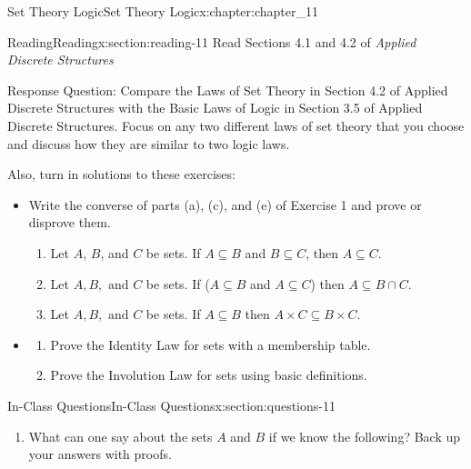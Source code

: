 \documentclass[oneside,10pt,]{book}
\numberwithin{equation}{section}
\begin{document}
\begin{chapterptx}{Set Theory Logic}{}{Set Theory Logic}{}{}{x:chapter:chapter_11}
%
%
\typeout{************************************************}
\typeout{************************************************}
%
\begin{sectionptx}{Reading}{}{Reading}{}{}{x:section:reading-11}
Read Sections 4.1  and 4.2 of \emph{Applied Discrete Structures}%
\par
Response Question: Compare the Laws of Set Theory in Section 4.2 of Applied Discrete Structures with the Basic Laws of Logic in Section 3.5 of Applied Discrete Structures.  Focus on any two different laws of set theory that you choose and discuss how they are similar to two logic laws.%
\par
Also, turn in solutions to these exercises:%
\begin{itemize}[label=\textbullet]
\item{}Write the converse of parts (a), (c), and (e) of Exercise 1 and prove or disprove them.%
\begin{enumerate}[label=(\alph*)]
\item{}Let \(A\), \(B\), and \(C\) be sets. If \(A\subseteq B\) and \(B\subseteq C\), then \(A\subseteq C\).%
\item{}Let \(A,B, \textrm{ and } C\) be sets. If (\(A\subseteq B\) and \(A\subseteq C\)) then \(A\subseteq B\cap C\).%
\item{}Let \(A,B, \textrm{ and } C\) be sets. If \(A\subseteq B\) then \(A\times C \subseteq B\times C\).%
\end{enumerate}
%
\item{}%
\begin{enumerate}[label=(\alph*)]
\item{}Prove the Identity Law for sets  with a membership table.%
\item{}Prove the Involution Law  for sets using basic definitions.%
\end{enumerate}
%
\end{itemize}
%
\end{sectionptx}
%
%
\typeout{************************************************}
\typeout{************************************************}
%
\begin{sectionptx}{In-Class Questions}{}{In-Class Questions}{}{}{x:section:questions-11}
%
\begin{enumerate}[label=\arabic*.]
\item{}What can one say about the sets \(A\) and \(B\) if we know the following?  Back up your answers with proofs.%

\end{enumerate}
\end{sectionptx}
\end{chapterptx}
\end{document}

